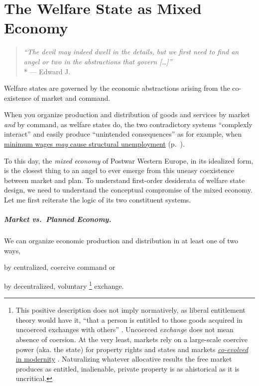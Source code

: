 
\chapter[Mixed Economy]{The Welfare State as Mixed Economy} \label{chap:mixed-economy}

\begin{quote}
	\emph{``The devil may indeed dwell in the details, but we first need to find an angel or two in the abstractions that govern [\ldots]''}
	\\*
	--- Edward J.\ \citet[loc.~117]{McCaffery2002}
\end{quote}

Welfare states are governed by the economic abstractions arising from the co-existence of market and command.

When you organize production and distribution of goods and services by market \emph{and} by command, as welfare states do, the two contradictory systems ``complexly interact'' \citep{Perrow-1999-aa} and easily produce ``unintended consequences'' \citep{Merton-1936-aa} as for example, when \hyperref[sec:price-floors]{minimum wages \emph{may} cause structural unemployment} (p.~\pageref{sec:price-floors}).

To this day, the \emph{mixed economy} of Postwar Western Europe, in its idealized form, is the closest thing to an angel to ever emerge from this uneasy coexistence between market and plan.
To understand first-order desiderata of welfare state design, we need to understand the conceptual compromise of the mixed economy.
Let me first reiterate the logic of its two constituent systems.

\paragraph[Market vs.\ Plan]{Market vs.\ Planned Economy.}  \label{sec:market-vs-command}

We can organize economic production and distribution in at least one of two ways,
\begin{inparaenum}
	\item
		by centralized, coercive command or
	\item
		by decentralized, voluntary
		\footnote{
			\label{fn:tilly} This positive description does not imply normatively, as liberal entitlement theory would have it, ``that a person is entitled to those goods acquired in uncoerced exchanges with others'' \citep[149]{Nozick1974,Friedman1962}.
			Uncoerced \emph{exchange} does not mean absence of coersion.
			At the very least, markets rely on a large-scale coercive power (aka. the state) for property rights and states and markets \hyperref[sec:modernity]{\emph{co-evolved} in modernity} \citep{Tilly-1985-aa}.
			Naturalizing whatever allocative results the free market produces as entitled, inalienable, private property is as ahistorical as it is uncritical.
		}
		exchange.
\end{inparaenum}

